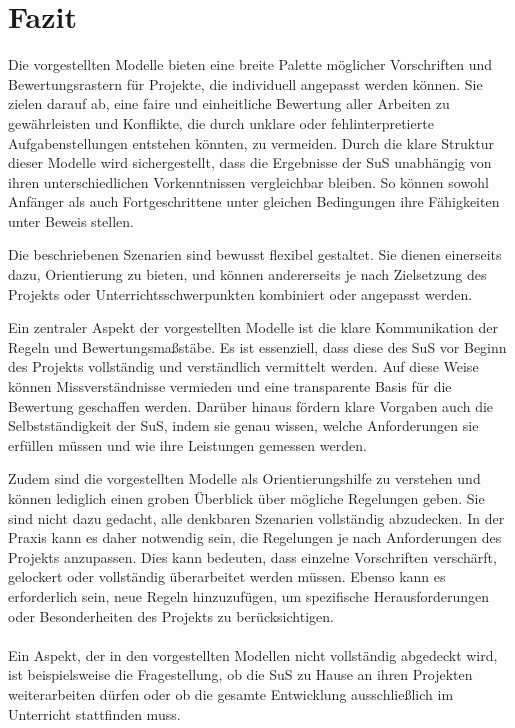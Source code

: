 \documentclass[a4paper,12pt]{article}
\begin{document}
\section{Fazit}
Die vorgestellten Modelle bieten eine breite Palette möglicher Vorschriften und Bewertungsrastern für Projekte, die individuell angepasst werden können. Sie zielen darauf ab, eine faire und einheitliche Bewertung aller Arbeiten zu gewährleisten und Konflikte, die durch unklare oder fehlinterpretierte Aufgabenstellungen entstehen könnten, zu vermeiden. Durch die klare Struktur dieser Modelle wird sichergestellt, dass die Ergebnisse der SuS unabhängig von ihren unterschiedlichen Vorkenntnissen vergleichbar bleiben. So können sowohl Anfänger als auch Fortgeschrittene unter gleichen Bedingungen ihre Fähigkeiten unter Beweis stellen.

Die beschriebenen Szenarien sind bewusst flexibel gestaltet. Sie dienen einerseits dazu, Orientierung zu bieten, und können andererseits je nach Zielsetzung des Projekts oder Unterrichtsschwerpunkten kombiniert oder angepasst werden.

Ein zentraler Aspekt der vorgestellten Modelle ist die klare Kommunikation der Regeln und Bewertungsmaßstäbe. Es ist essenziell, dass diese des SuS vor Beginn des Projekts vollständig und verständlich vermittelt werden. Auf diese Weise können Missverständnisse vermieden und eine transparente Basis für die Bewertung geschaffen werden. Darüber hinaus fördern klare Vorgaben auch die Selbstständigkeit der SuS, indem sie genau wissen, welche Anforderungen sie erfüllen müssen und wie ihre Leistungen gemessen werden.

Zudem sind die vorgestellten Modelle als Orientierungshilfe zu verstehen und können lediglich einen groben Überblick über mögliche Regelungen geben. Sie sind nicht dazu gedacht, alle denkbaren Szenarien vollständig abzudecken. In der Praxis kann es daher notwendig sein, die Regelungen je nach Anforderungen des Projekts anzupassen. Dies kann bedeuten, dass einzelne Vorschriften verschärft, gelockert oder vollständig überarbeitet werden müssen. Ebenso kann es erforderlich sein, neue Regeln hinzuzufügen, um spezifische Herausforderungen oder Besonderheiten des Projekts zu berücksichtigen.\\
\\

Ein Aspekt, der in den vorgestellten Modellen nicht vollständig abgedeckt wird, ist beispielsweise die Fragestellung, ob die SuS zu Hause an ihren Projekten weiterarbeiten dürfen oder ob die gesamte Entwicklung ausschließlich im Unterricht stattfinden muss.
\end{document}
